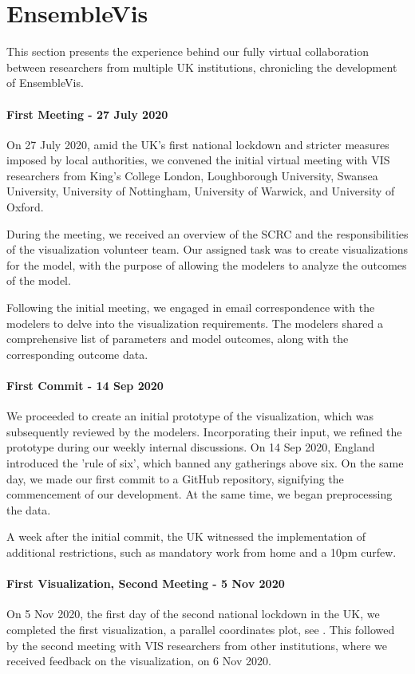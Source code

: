 \section{EnsembleVis}
\label{sec:EnsembleVis}

This section presents the experience behind our fully virtual collaboration between researchers from multiple UK institutions, chronicling the development of EnsembleVis.


\paragraph{First Meeting - 27 July 2020}
\label{subsec:InitialMeeting}
On 27 July 2020, amid the UK's first national lockdown and stricter measures imposed by local authorities, we convened the initial virtual meeting with VIS researchers from King's College London, Loughborough University, Swansea University, University of Nottingham, University of Warwick, and University of Oxford.

During the meeting, we received an overview of the SCRC and the responsibilities of the visualization volunteer team.
Our assigned task was to create visualizations for the model, with the purpose of allowing the modelers to analyze the outcomes of the model.

Following the initial meeting, we engaged in email correspondence with the modelers to delve into the visualization requirements. The modelers shared a comprehensive list of parameters and model outcomes, along with the corresponding outcome data.
\paragraph{First Commit - 14 Sep 2020}
We proceeded to create an initial prototype of the visualization, which was subsequently reviewed by the modelers.
Incorporating their input, we refined the prototype during our weekly internal discussions.
On 14 Sep 2020, England introduced the 'rule of six', which banned any gatherings above six.
On the same day, we made our first commit to a GitHub repository, signifying the commencement of our development.
At the same time, we began preprocessing the data.

A week after the initial commit, the UK witnessed the implementation of additional restrictions, such as mandatory work from home and a 10pm curfew.

\paragraph{First Visualization, Second Meeting - 5 Nov 2020}
On 5 Nov 2020, the first day of the second national lockdown in the UK, we completed the first visualization, a parallel coordinates plot, see .
This followed by the second meeting with VIS researchers from other institutions, where we received feedback on the visualization, on 6 Nov 2020.

